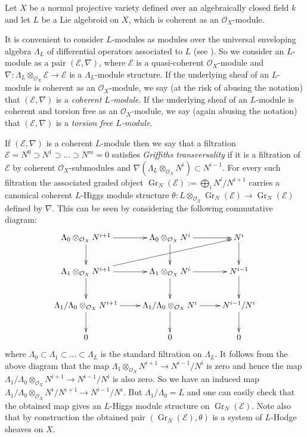 \documentclass[12pt]{article}
\theoremstyle{plain}
\theoremstyle{definition}
\theoremstyle{remark}
\newcommand{\cE}{{\mathcal E}}
\newcommand{\cO}{{\mathcal O}}
\newcommand{\Gr}{{\mathop{Gr}}}
\begin{document}
Let $X$ be a normal projective variety defined over an algebraically closed field $k$
and let $L$ be a Lie algebroid on $X$, which is coherent as an $\cO_X$-module.

 It is convenient to consider $L$-modules  as modules over the universal enveloping algebra $\Lambda _L$
 of differential operators associated to $L$ (see \cite[Section 2.2]{La2}).
 So we consider an $L$-module as a pair  $(\cE, \nabla)$, where $\cE$ is a quasi-coherent $\cO_X$-module
and $\nabla: \Lambda _L\otimes_{ \cO_X} \cE \to \cE$ is a $\Lambda _L$-module structure. 
If the underlying sheaf of an $L$-module is coherent as
an $\cO_X$-module, we say (at the risk of  abusing the notation) that $(\cE, \nabla)$ is a \emph{coherent $L$-module}. 
If the underlying sheaf of an $L$-module is coherent and torsion free as
an $\cO_X$-module, we say (again abusing the notation) that $(\cE, \nabla)$ is a \emph{torsion free $L$-module}. 
 
 If  $(\cE, \nabla)$ is a coherent $L$-module then we say that a filtration $\cE=N^0\supset
N^1\supset ...\supset N^m=0$ satisfies \emph{Griffiths
transversality} if it is a filtration of $\cE$ by coherent $\cO_X$-submodules and
$\nabla (\Lambda _L\otimes_{ \cO_X} N^i)\subset N^{i-1}$. For every such filtration the associated graded object $\Gr
_N(\cE):=\bigoplus _i N^i/N^{i+1}$ carries a canonical coherent
$L$-Higgs module structure $\theta: L\otimes_{ \cO_X}\Gr
_N(\cE)\to \Gr _N(\cE)$ defined by $\nabla$.
This can be seen by considering the following commutative diagram:
$$
\xymatrix{
\Lambda_0\otimes_{ \cO_X} N^{i+1}\ar[r]\ar[d]&\Lambda_0\otimes_{ \cO_X} N^{i}\ar[r]\ar[d]&N^i\ar[d]\\
\Lambda_1\otimes_{ \cO_X} N^{i+1}\ar[r]\ar[d]\ar[rru]&\Lambda_1\otimes_{ \cO_X} N^{i}\ar[r]\ar[d]&N^{i-1}\ar[d]\\
\Lambda_1/\Lambda_0\otimes_{ \cO_X} N^{i+1}\ar[r]\ar[d]&\Lambda_1/\Lambda_0\otimes_{ \cO_X} N^{i}\ar[r]\ar[d]&N^{i-1}/N^i\ar[d]\\
0&0&0\\
}
$$
where $\Lambda_0\subset \Lambda _1\subset ... \subset \Lambda _L$ is the standard filtration on $\Lambda _L$.
It follows from the above diagram that the map $\Lambda_1\otimes_{ \cO_X} N^{i+1}\to N^{i-1}/N^i$ is zero and hence
the map $\Lambda_1/\Lambda_0\otimes_{ \cO_X} N^{i+1}\to N^{i-1}/N^i$ is also zero. So we have an induced map $\Lambda_1/\Lambda_0\otimes_{ \cO_X} N^{i}/N^{i+1}\to N^{i-1}/N^i$. But $\Lambda_1/\Lambda_0=L$ and one can easily check that the obtained map gives an $L$-Higgs module structure on  $\Gr_N(\cE)$.
 Note also that by construction the obtained pair $(\Gr_N(\cE), \theta)$ is a system of $L$-Hodge sheaves on $X$. 
\end{document}
